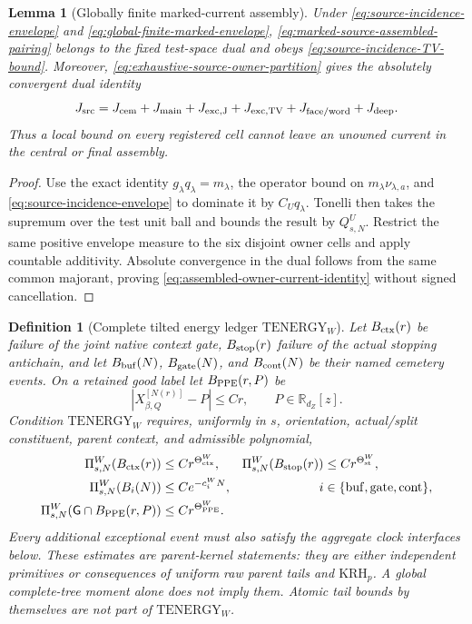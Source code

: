 \documentclass[11pt]{article}
\newtheorem{lemma}[theorem]{Lemma}
\newtheorem{definition}[theorem]{Definition}
\begin{document}
\begin{lemma}[Globally finite marked-current assembly]
\label{lem:globally-finite-marked-current}
Under \eqref{eq:source-incidence-envelope} and
\eqref{eq:global-finite-marked-envelope},
\eqref{eq:marked-source-assembled-pairing} belongs to the fixed test-space
dual and obeys \eqref{eq:source-incidence-TV-bound}.  Moreover,
\eqref{eq:exhaustive-source-owner-partition} gives the absolutely convergent
dual identity
\begin{equation}
\label{eq:assembled-owner-current-identity}
 J_{\rm src}=J_{\rm cem}+J_{\rm main}+J_{\rm exc,J}+J_{\rm exc,TV}
              +J_{\rm face/word}+J_{\rm deep}.
\end{equation}
Thus a local bound on every registered cell cannot leave an unowned current
in the central or final assembly.
\end{lemma}

\begin{proof}
Use the exact identity $g_\lambda q_\lambda=m_\lambda$, the operator bound on
$m_\lambda\nu_{\lambda,a}$, and
\eqref{eq:source-incidence-envelope} to dominate it by
$C_Uq_\lambda$.  Tonelli then takes the supremum over the test unit ball and
bounds the result by $Q_{s,N}^{U}$.
Restrict the same positive envelope measure to the six disjoint owner cells
and apply countable additivity.  Absolute convergence in the dual follows
from the same common majorant, proving
\eqref{eq:assembled-owner-current-identity} without signed cancellation.
\end{proof}

\begin{definition}[Complete tilted energy ledger
$\mathrm{TENERGY}_{W}$]
\label{def:tilted-energy-ledger}
Let $B_{\rm ctx}(r)$ be failure of the joint native context gate,
$B_{\rm stop}(r)$ failure of the actual stopping antichain, and let
$B_{\rm buf}(N)$, $B_{\rm gate}(N)$, and $B_{\rm cont}(N)$ be their named
cemetery events.  On a retained good label let $B_{\rm PPE}(r,P)$ be
\[
 |X^{[N(r)]}_{\beta,Q}-P|\le Cr,
 \qquad P\in\mathbb R_{d_Z}[z].
\]
Condition $\mathrm{TENERGY}_{W}$ requires, uniformly in $s$, orientation,
actual/split constituent, parent context, and admissible polynomial,
\begin{align}
 \Pi_{s,N}^{W}(B_{\rm ctx}(r))&\le Cr^{\Theta_{\rm ctx}^{W}},&
 \Pi_{s,N}^{W}(B_{\rm stop}(r))&\le Cr^{\Theta_{\rm st}^{W}},
 \label{eq:tilted-context-stop-tails}\\
 \Pi_{s,N}^{W}(B_i(N))&\le Ce^{-c_i^{W}N},
 &i&\in\{\mathrm{buf},\mathrm{gate},\mathrm{cont}\},
 \label{eq:tilted-auxiliary-tails}\\
 \Pi_{s,N}^{W}(\mathsf G\cap B_{\rm PPE}(r,P))&\le
 Cr^{\Theta_{\rm PPE}^{W}}.
 \label{eq:tilted-PPE-tail}
\end{align}
Every additional exceptional event must also satisfy the aggregate clock
interfaces below.  These estimates are parent-kernel statements: they are
either independent primitives or consequences of uniform raw parent tails
and $\mathrm{KRH}_{p}$.  A global complete-tree moment alone does not imply
them.  Atomic tail bounds by themselves are not part of
$\mathrm{TENERGY}_{W}$.
\end{definition}
\end{document}
